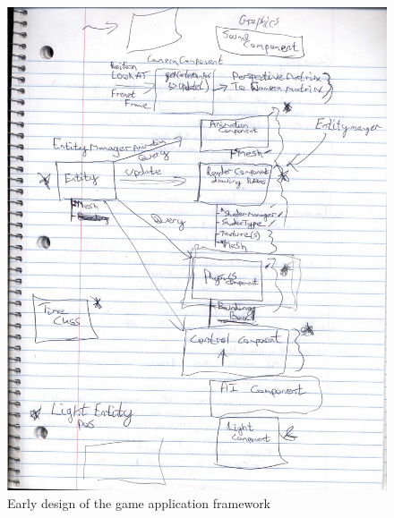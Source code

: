 \documentclass{article}
\theoremstyle{definition}
\begin{document}
\begin{figure}[htpb]
  \centering
  \includegraphics[width=0.8\linewidth]{Brainstorming_002.jpg}
  \caption{Early design of the game application framework}
\label{fig:Brainstorming_002}
\end{figure}
\end{document}
